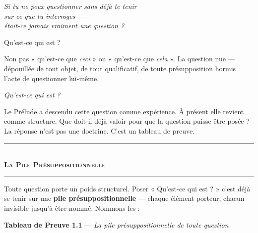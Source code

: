 \documentclass[10pt, openany, oneside]{book}
\renewcommand{\normalsize}{\fontsize{10}{13}\selectfont}
\begin{document}
\vspace{1.5em}

\begin{center}
    \itshape
    Si tu ne peux questionner sans déjà te tenir\\
    sur ce que tu interroges ---\\
    était-ce jamais vraiment une question ?
\end{center}

\vspace{2em}


\noindent Qu'est-ce qui est ?

Non pas « qu'est-ce que \textit{ceci} » ou « qu'est-ce que \textit{cela} ». La question nue --- dépouillée de tout objet, de tout qualificatif, de toute présupposition hormis l'acte de questionner lui-même.

\textit{Qu'est-ce qui est ?}

Le Prélude a descendu cette question comme expérience. À présent elle revient comme structure. Que doit-il déjà valoir pour que la question puisse être posée ? La réponse n'est pas une doctrine. C'est un tableau de preuve.

\vspace{1.5em}


\begin{center}
    \rule{0.3\textwidth}{0.4pt}\\[0.5em]
    {\normalsize\bfseries\scshape La Pile Présuppositionnelle}\\[0.3em]
    \rule{0.3\textwidth}{0.4pt}
\end{center}

\vspace{1em}

Toute question porte un poids structurel. Poser « Qu'est-ce qui est ? » c'est déjà se tenir sur une \textbf{pile présuppositionnelle} --- chaque élément porteur, chacun invisible jusqu'à être nommé. Nommons-les :

\vspace{0.8em}

\textbf{Tableau de Preuve 1.1} --- \textit{La pile présuppositionnelle de toute question}
\end{document}
